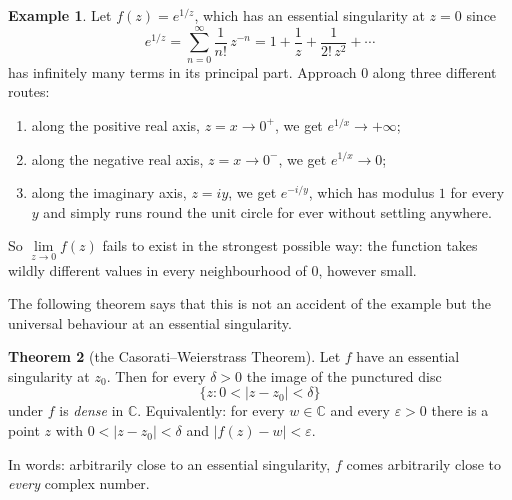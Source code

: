 \documentclass[11pt,a4paper]{article}
\theoremstyle{definition}
\newtheorem{thm}{Theorem}[section]
\newtheorem{example}[thm]{Example}
\begin{document}
\begin{example}
Let $f(z) = e^{1/z}$, which has an essential singularity at $z = 0$ since
$$e^{1/z} = \sum^{\infty}_{n = 0}\frac{1}{n!}\,z^{-n}
= 1 + \frac{1}{z} + \frac{1}{2!\,z^2} + \cdots$$
has infinitely many terms in its principal part. Approach $0$ along three
different routes:
\begin{enumerate}
\item[(i).] along the positive real axis, $z = x \rightarrow 0^{+}$, we get
$e^{1/x} \rightarrow +\infty$;
\item[(ii).] along the negative real axis, $z = x \rightarrow 0^{-}$, we get
$e^{1/x} \rightarrow 0$;
\item[(iii).] along the imaginary axis, $z = iy$, we get
$e^{-i/y}$, which has modulus $1$ for every $y$ and simply runs round the unit
circle for ever without settling anywhere.
\end{enumerate}
So $\lim\limits_{z \rightarrow 0} f(z)$ fails to exist in the strongest possible
way: the function takes wildly different values in every neighbourhood of $0$,
however small.

The following theorem says that this is not an accident of the example but the
universal behaviour at an essential singularity.
\end{example}

\begin{thm}[the Casorati--Weierstrass Theorem]
Let $f$ have an essential singularity at $z_0$. Then for every $\delta > 0$ the
image of the punctured disc
$$\{ z : 0 < \left|z - z_0\right| < \delta \}$$
under $f$ is \emph{dense} in $\mathbb{C}$. Equivalently: for every
$w \in \mathbb{C}$ and every $\varepsilon > 0$ there is a point $z$ with
$0 < \left|z - z_0\right| < \delta$ and $\left|f(z) - w\right| < \varepsilon$.

In words: arbitrarily close to an essential singularity, $f$ comes arbitrarily
close to \emph{every} complex number.
\end{thm}
\end{document}
